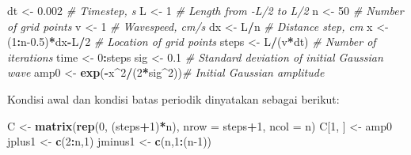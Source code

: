 \documentclass[
]{book}
\newenvironment{Shaded}{\begin{snugshade}}{\end{snugshade}}
\newcommand{\AttributeTok}[1]{\textcolor[rgb]{0.13,0.29,0.53}{#1}}
\newcommand{\CommentTok}[1]{\textcolor[rgb]{0.56,0.35,0.01}{\textit{#1}}}
\newcommand{\DecValTok}[1]{\textcolor[rgb]{0.00,0.00,0.81}{#1}}
\newcommand{\FloatTok}[1]{\textcolor[rgb]{0.00,0.00,0.81}{#1}}
\newcommand{\FunctionTok}[1]{\textcolor[rgb]{0.13,0.29,0.53}{\textbf{#1}}}
\newcommand{\NormalTok}[1]{#1}
\newcommand{\OtherTok}[1]{\textcolor[rgb]{0.56,0.35,0.01}{#1}}
\newcommand{\SpecialCharTok}[1]{\textcolor[rgb]{0.81,0.36,0.00}{\textbf{#1}}}
\theoremstyle{definition}
\theoremstyle{definition}
\theoremstyle{definition}
\theoremstyle{definition}
\theoremstyle{remark}
\begin{document}
\begin{Shaded}
\begin{Highlighting}[]
\NormalTok{dt    }\OtherTok{\textless{}{-}} \FloatTok{0.002}              \CommentTok{\# Timestep, s}
\NormalTok{L     }\OtherTok{\textless{}{-}} \DecValTok{1}                  \CommentTok{\# Length from {-}L/2 to L/2}
\NormalTok{n     }\OtherTok{\textless{}{-}} \DecValTok{50}                 \CommentTok{\# Number of grid points}
\NormalTok{v     }\OtherTok{\textless{}{-}} \DecValTok{1}                  \CommentTok{\# Wavespeed, cm/s}
\NormalTok{dx    }\OtherTok{\textless{}{-}}\NormalTok{ L}\SpecialCharTok{/}\NormalTok{n                }\CommentTok{\# Distance step, cm}
\NormalTok{x     }\OtherTok{\textless{}{-}}\NormalTok{ (}\DecValTok{1}\SpecialCharTok{:}\NormalTok{n}\FloatTok{{-}0.5}\NormalTok{)}\SpecialCharTok{*}\NormalTok{dx}\SpecialCharTok{{-}}\NormalTok{L}\SpecialCharTok{/}\DecValTok{2}   \CommentTok{\# Location of grid points}
\NormalTok{steps }\OtherTok{\textless{}{-}}\NormalTok{ L}\SpecialCharTok{/}\NormalTok{(v}\SpecialCharTok{*}\NormalTok{dt)           }\CommentTok{\# Number of iterations}
\NormalTok{time  }\OtherTok{\textless{}{-}} \DecValTok{0}\SpecialCharTok{:}\NormalTok{steps  }
\NormalTok{sig   }\OtherTok{\textless{}{-}} \FloatTok{0.1}                \CommentTok{\# Standard deviation of initial Gaussian wave}
\NormalTok{amp0  }\OtherTok{\textless{}{-}} \FunctionTok{exp}\NormalTok{(}\SpecialCharTok{{-}}\NormalTok{x}\SpecialCharTok{\^{}}\DecValTok{2}\SpecialCharTok{/}\NormalTok{(}\DecValTok{2}\SpecialCharTok{*}\NormalTok{sig}\SpecialCharTok{\^{}}\DecValTok{2}\NormalTok{))}\CommentTok{\# Initial Gaussian amplitude}
\end{Highlighting}
\end{Shaded}

Kondisi awal dan kondisi batas periodik dinyatakan sebagai berikut:

\begin{Shaded}
\begin{Highlighting}[]
\NormalTok{C }\OtherTok{\textless{}{-}} \FunctionTok{matrix}\NormalTok{(}\FunctionTok{rep}\NormalTok{(}\DecValTok{0}\NormalTok{, (steps}\SpecialCharTok{+}\DecValTok{1}\NormalTok{)}\SpecialCharTok{*}\NormalTok{n), }\AttributeTok{nrow =}\NormalTok{ steps}\SpecialCharTok{+}\DecValTok{1}\NormalTok{, }\AttributeTok{ncol =}\NormalTok{ n)}
\NormalTok{C[}\DecValTok{1}\NormalTok{, ] }\OtherTok{\textless{}{-}}\NormalTok{ amp0}
\NormalTok{jplus1 }\OtherTok{\textless{}{-}} \FunctionTok{c}\NormalTok{(}\DecValTok{2}\SpecialCharTok{:}\NormalTok{n,}\DecValTok{1}\NormalTok{)}
\NormalTok{jminus1 }\OtherTok{\textless{}{-}} \FunctionTok{c}\NormalTok{(n,}\DecValTok{1}\SpecialCharTok{:}\NormalTok{(n}\DecValTok{{-}1}\NormalTok{))}
\end{Highlighting}
\end{Shaded}
\end{document}
